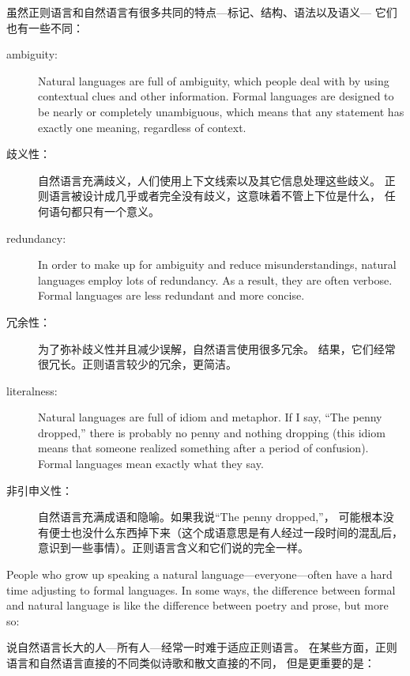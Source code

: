 \documentclass[10pt]{book}
\begin{document}
\begin{CJK}{UTF8}{gbsn}
虽然正则语言和自然语言有很多共同的特点---标记、结构、语法以及语义---
它们也有一些不同：

\begin{description}

\item[ambiguity:] Natural languages are full of ambiguity, which
people deal with by using contextual clues and other information.
Formal languages are designed to be nearly or completely unambiguous,
which means that any statement has exactly one meaning,
regardless of context.

\item[歧义性：] 自然语言充满歧义，人们使用上下文线索以及其它信息处理这些歧义。
正则语言被设计成几乎或者完全没有歧义，这意味着不管上下位是什么，
任何语句都只有一个意义。

\item[redundancy:] In order to make up for ambiguity and reduce
misunderstandings, natural languages employ lots of
redundancy.  As a result, they are often verbose.  Formal languages
are less redundant and more concise.

\item[冗余性：] 为了弥补歧义性并且减少误解，自然语言使用很多冗余。
结果，它们经常很冗长。正则语言较少的冗余，更简洁。

\item[literalness:] Natural languages are full of idiom and metaphor.
If I say, ``The penny dropped,'' there is probably no penny and
nothing dropping (this idiom means that someone realized something
after a period of confusion).  Formal languages
mean exactly what they say.

\item[非引申义性：] 自然语言充满成语和隐喻。如果我说``The penny dropped,''，
可能根本没有便士也没什么东西掉下来（这个成语意思是有人经过一段时间的混乱后，
意识到一些事情）。正则语言含义和它们说的完全一样。

\end{description}

People who grow up speaking a natural language---everyone---often have a
hard time adjusting to formal languages.  In some ways, the difference
between formal and natural language is like the difference between
poetry and prose, but more so:

说自然语言长大的人---所有人---经常一时难于适应正则语言。
在某些方面，正则语言和自然语言直接的不同类似诗歌和散文直接的不同，
但是更重要的是：

\begin{description}


\end{description}
\end{CJK}
\end{document}
